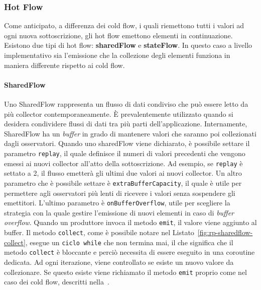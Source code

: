 \documentclass[12pt,a4paper,openright,twoside]{book}
\begin{document}
\subsubsection{Hot Flow}
\label{sec:hot-flow}
Come anticipato, a differenza dei cold flow, i quali riemettono tutti i valori ad ogni nuova sottoscrizione, gli hot flow emettono elementi in continuazione. 
Esistono due tipi di hot flow: \textbf{sharedFlow} e \textbf{stateFlow}. 
In questo caso a livello implementativo sia l'emissione che la collezione degli elementi funziona in maniera differente rispetto ai cold flow. 

\paragraph{SharedFlow}
Uno SharedFlow rappresenta un flusso di dati condiviso che può essere letto da più collector contemporaneamente. È prevalentemente utilizzato quando si desidera condividere flussi di dati tra più parti dell'applicazione. 
Internamente, SharedFlow ha un \textit{buffer} in grado di mantenere valori che saranno poi collezionati dagli osservatori. 
Quando uno sharedFlow viene dichiarato, è possibile settare il parametro \texttt{replay}, il quale definisce il numeri di valori precedenti che vengono emessi ai nuovi collector all'atto della sottoscrizione. Ad esempio, se \texttt{replay} è settato a 2, il flusso emetterà gli ultimi due valori ai nuovi collector. 
Un altro parametro che è possibile settare è \texttt{extraBufferCapacity}, il quale è utile per permettere agli osservatori più lenti di ricevere i valori senza sospendere gli emettitori. 
L'ultimo parametro è \texttt{onBufferOverflow}, utile per scegliere la strategia con la quale gestire l'emissione di nuovi elementi in caso di \textit{buffer overflow}. 
Quando un produttore invoca il metodo \texttt{emit}, il valore viene aggiunto al buffer. 
Il metodo \texttt{collect}, come è possibile notare nel Listato~\ref{fig:rp-sharedflow-collect}, esegue un \texttt{ciclo while} che non termina mai, il che significa che il metodo \texttt{collect} è bloccante e perciò necessita di essere eseguito in una coroutine dedicata. 
Ad ogni iterazione, viene controllato se esiste un nuovo valore da collezionare. Se questo esiste viene richiamato il metodo \texttt{emit} proprio come nel caso dei cold flow, descritti nella~. 


\end{document}
